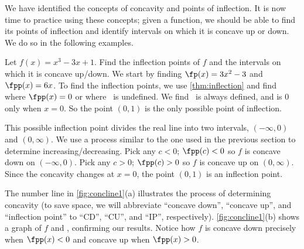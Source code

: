 We have identified the concepts of concavity and points of inflection. It is now time to practice using these concepts; given a function, we should be able to find its points of inflection and identify intervals on which it is concave up or down. We do so in the following examples.


\begin{example}\label{ex_conc1}
Let $f(x)=x^3-3x+1$. Find the inflection points of $f$ and the intervals on which it is concave up/down.
\solution
We start by finding $\fp(x)=3x^2-3$ and $\fpp(x)=6x$.  To find the inflection points, we use \autoref{thm:inflection} and find where $\fpp(x)=0$ or where \fpp\ is undefined. We find \fpp\ is always defined, and is 0 only when $x=0$. So the point $(0,1)$ is the only possible point of inflection.


This possible inflection point divides the real line into two intervals, $(-\infty,0)$ and $(0,\infty)$. We use a process similar to the one used in the previous section to determine increasing/decreasing. Pick any $c<0$; $\fpp(c)<0$ so $f$ is concave down on $(-\infty,0)$. Pick any $c>0$; $\fpp(c)>0$ so $f$ is concave up on $(0,\infty)$. Since the concavity changes at $x=0$, the point $(0,1)$ is an inflection point.

The number line in \autoref{fig:concline1}(a) illustrates the process of determining concavity (to save space, we will abbreviate ``concave down'', ``concave up'', and ``inflection point'' to ``CD'', ``CU'', and ``IP'', respectively). \autoref{fig:concline1}(b) shows a graph of $f$ and \fpp, confirming our results. Notice how $f$ is concave down precisely when $\fpp(x)<0$ and concave up when $\fpp(x)>0$.
\end{example}

